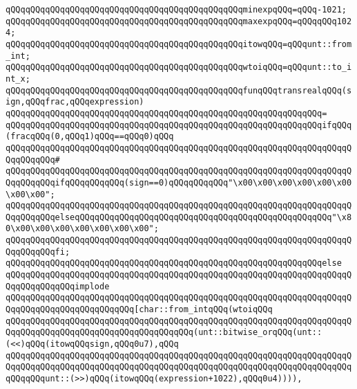 \newline
\verb|qQQqqQQqqQQqqQQqqQQqqQQqqQQqqQQqqQQqqQQqqQQqqQQqminexpqQQq=qQQq-1021;|\newline
\verb|qQQqqQQqqQQqqQQqqQQqqQQqqQQqqQQqqQQqqQQqqQQqqQQqmaxexpqQQq=qQQqqQQq1024;|\newline
\newline
\verb|qQQqqQQqqQQqqQQqqQQqqQQqqQQqqQQqqQQqqQQqqQQqqQQqitowqQQq=qQQqunt::from_int;|\newline
\verb|qQQqqQQqqQQqqQQqqQQqqQQqqQQqqQQqqQQqqQQqqQQqqQQqwtoiqQQq=qQQqunt::to_int_x;|\newline
\newline
\verb|qQQqqQQqqQQqqQQqqQQqqQQqqQQqqQQqqQQqqQQqqQQqqQQqfunqQQqtransrealqQQq(sign,qQQqfrac,qQQqexpression)|\newline
\verb|qQQqqQQqqQQqqQQqqQQqqQQqqQQqqQQqqQQqqQQqqQQqqQQqqQQqqQQqqQQqqQQq=|\newline
\verb|qQQqqQQqqQQqqQQqqQQqqQQqqQQqqQQqqQQqqQQqqQQqqQQqqQQqqQQqqQQqqQQqifqQQq(fracqQQq(0,qQQq1)qQQq==qQQq0)qQQq|\newline
\verb|qQQqqQQqqQQqqQQqqQQqqQQqqQQqqQQqqQQqqQQqqQQqqQQqqQQqqQQqqQQqqQQqqQQqqQQqqQQqqQQq#|\newline
\verb|qQQqqQQqqQQqqQQqqQQqqQQqqQQqqQQqqQQqqQQqqQQqqQQqqQQqqQQqqQQqqQQqqQQqqQQqqQQqqQQqifqQQqqQQqqQQq(sign==0)qQQqqQQqqQQq"\x00\x00\x00\x00\x00\x00\x00\x00";|\newline
\verb|qQQqqQQqqQQqqQQqqQQqqQQqqQQqqQQqqQQqqQQqqQQqqQQqqQQqqQQqqQQqqQQqqQQqqQQqqQQqqQQqelseqQQqqQQqqQQqqQQqqQQqqQQqqQQqqQQqqQQqqQQqqQQqqQQqqQQq"\x80\x00\x00\x00\x00\x00\x00\x00";|\newline
\verb|qQQqqQQqqQQqqQQqqQQqqQQqqQQqqQQqqQQqqQQqqQQqqQQqqQQqqQQqqQQqqQQqqQQqqQQqqQQqqQQqfi;|\newline
\verb|qQQqqQQqqQQqqQQqqQQqqQQqqQQqqQQqqQQqqQQqqQQqqQQqqQQqqQQqqQQqqQQqelse|\newline
\verb|qQQqqQQqqQQqqQQqqQQqqQQqqQQqqQQqqQQqqQQqqQQqqQQqqQQqqQQqqQQqqQQqqQQqqQQqqQQqqQQqqQQqimplode|\newline
\verb|qQQqqQQqqQQqqQQqqQQqqQQqqQQqqQQqqQQqqQQqqQQqqQQqqQQqqQQqqQQqqQQqqQQqqQQqqQQqqQQqqQQqqQQqqQQqqQQq[char::from_intqQQq(wtoiqQQq|\newline
\verb|qQQqqQQqqQQqqQQqqQQqqQQqqQQqqQQqqQQqqQQqqQQqqQQqqQQqqQQqqQQqqQQqqQQqqQQqqQQqqQQqqQQqqQQqqQQqqQQqqQQqqQQqqQQq(unt::bitwise_orqQQq(unt::(<<)qQQq(itowqQQqsign,qQQq0u7),qQQq|\newline
\verb|qQQqqQQqqQQqqQQqqQQqqQQqqQQqqQQqqQQqqQQqqQQqqQQqqQQqqQQqqQQqqQQqqQQqqQQqqQQqqQQqqQQqqQQqqQQqqQQqqQQqqQQqqQQqqQQqqQQqqQQqqQQqqQQqqQQqqQQqqQQqqQQqqQQqunt::(>>)qQQq(itowqQQq(expression+1022),qQQq0u4)))),|\newline
